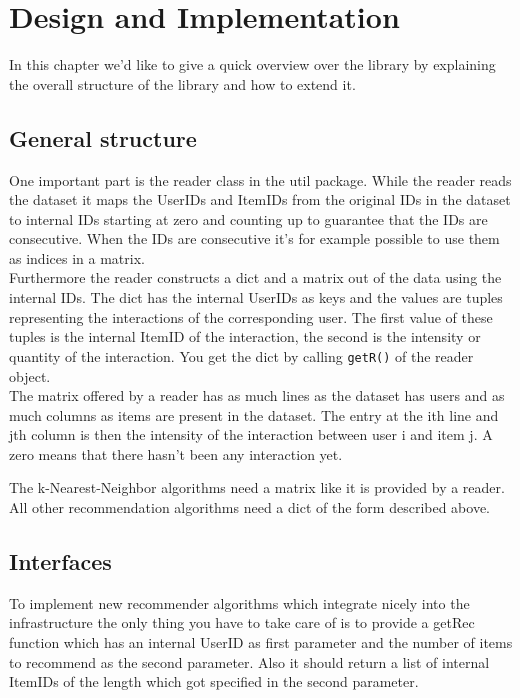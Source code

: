 
\chapter{Design and Implementation}
In this chapter we'd like to give a quick overview over the library
by explaining the overall structure of the library and how to extend it.


\section{General structure}
One important part is the reader class in the util package.
While the reader reads the dataset it maps the UserIDs and 
ItemIDs from the original IDs in the dataset to internal IDs 
starting at zero and counting up to guarantee that the IDs are consecutive. 
When the IDs are consecutive it's for example possible to use them as
indices in a matrix. \\Furthermore the reader constructs a dict and a matrix
out of the data using the internal IDs. The dict has the internal 
UserIDs as keys and the values are tuples representing the 
interactions of the corresponding user. The first value of these tuples is the internal
ItemID of the interaction, the second is the intensity or
quantity of the interaction. You get the dict by calling \lstinline!getR()!
of the reader object.\\
The matrix offered by a reader has as much lines as the dataset
has users and as much columns as items are present in the dataset.
The entry at the ith line and jth column is then the intensity of the interaction
between user i and item j. A zero means that there hasn't been any
interaction yet.

The k-Nearest-Neighbor algorithms need a matrix like it is provided by a
reader. All other recommendation algorithms need a dict of the 
form described above.

\section{Interfaces}
To implement new recommender algorithms which integrate nicely into the infrastructure
the only thing you have
to take care of is to provide a getRec function which has an 
internal UserID as first parameter and the number of items to recommend
as the second parameter. Also it should return a list of internal ItemIDs of the
length which got specified in the second parameter.

